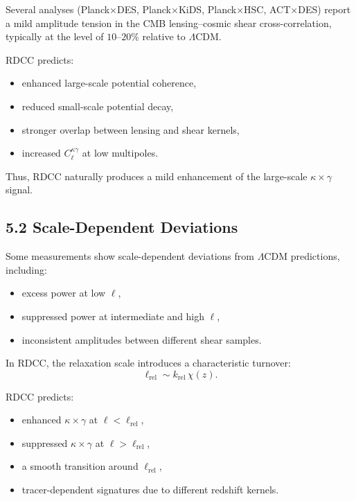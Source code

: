 \documentclass[11pt,a4paper]{article}
\begin{document}
Several analyses (Planck×DES, Planck×KiDS, Planck×HSC, ACT×DES) report a mild amplitude 
tension in the CMB lensing--cosmic shear cross-correlation, typically at the level of 
$10$--$20\%$ relative to $\Lambda$CDM.

RDCC predicts:

\begin{itemize}
    \item enhanced large-scale potential coherence,
    \item reduced small-scale potential decay,
    \item stronger overlap between lensing and shear kernels,
    \item increased $C_{\ell}^{\kappa\gamma}$ at low multipoles.
\end{itemize}

Thus, RDCC naturally produces a mild enhancement of the large-scale $\kappa \times \gamma$ 
signal.

\subsection*{5.2 Scale-Dependent Deviations}

Some measurements show scale-dependent deviations from $\Lambda$CDM predictions, including:

\begin{itemize}
    \item excess power at low $\ell$,
    \item suppressed power at intermediate and high $\ell$,
    \item inconsistent amplitudes between different shear samples.
\end{itemize}

In RDCC, the relaxation scale introduces a characteristic turnover:
\begin{equation}
    \ell_{\mathrm{rel}}
    \sim k_{\mathrm{rel}}\,\chi(z).
\end{equation}

RDCC predicts:

\begin{itemize}
    \item enhanced $\kappa \times \gamma$ at $\ell < \ell_{\mathrm{rel}}$,
    \item suppressed $\kappa \times \gamma$ at $\ell > \ell_{\mathrm{rel}}$,
    \item a smooth transition around $\ell_{\mathrm{rel}}$,
    \item tracer-dependent signatures due to different redshift kernels.
\end{itemize}
\end{document}
